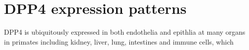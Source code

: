 \section{DPP4 expression patterns}
DPP4 is ubiquitously expressed in both endothelia and epithlia at many organs in primates including kidney, liver, lung, intestines and immune cells, which 